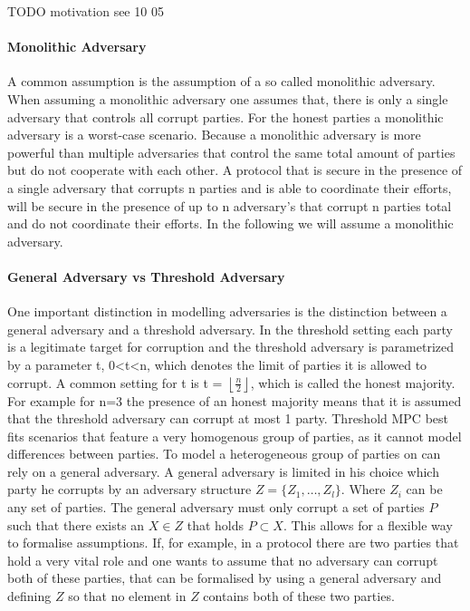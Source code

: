 TODO motivation see 10 05



\paragraph{Monolithic Adversary}
A common assumption is the assumption of a so called monolithic adversary. When assuming a monolithic adversary one assumes that, there is only a single adversary that controls all corrupt parties. For the honest parties a monolithic adversary is a worst-case scenario. Because a monolithic adversary is more powerful than multiple adversaries that control the same total amount of parties but do not cooperate with each other. A protocol that is secure in the presence of a single adversary that corrupts n parties and is able to coordinate their efforts, will be secure in the presence of up to n adversary's that corrupt n parties total and do not coordinate their efforts. In the following we will assume a monolithic adversary.
\paragraph{General Adversary vs Threshold Adversary}
One important distinction in modelling adversaries is the distinction between a general adversary and a threshold adversary.
In the threshold setting each party is a legitimate target for corruption and the threshold adversary is parametrized by a parameter t, 0<t<n, which denotes the limit of parties it is allowed to corrupt. A common setting for t is t = $\left \lfloor{ \frac{n}{2} }\right \rfloor  $, which is called the honest majority. For example for n=3 the presence of an honest majority means that it is assumed that the threshold adversary can corrupt at most 1 party. Threshold MPC best fits scenarios that feature a very homogenous group of parties, as it cannot model differences between parties. To model a heterogeneous group of parties on can rely on a general adversary.  A general adversary is limited in his choice which party he corrupts by an adversary structure  
$ Z = \{ Z_1, \dots, Z_l  \} $. Where $ Z_i $ can be any set of parties. The general adversary must only corrupt a set of parties  $ P $ such that there exists an $ X \in Z $ that holds $ P \subset X $. This allows for a flexible way to formalise assumptions. If, for example, in a protocol there are two parties that hold a very vital role and one wants to assume that no adversary can corrupt both of these parties, that can be formalised by using a general adversary and defining $ Z $ so that no element in  $Z $ contains both of these two parties.  
 
